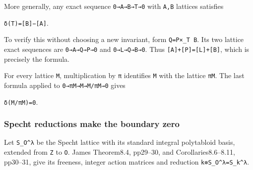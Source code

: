 \documentclass[
  10pt,
]{article}
\begin{document}
More generally, any exact sequence
\texttt{\small 0→\allowbreak{}A→\allowbreak{}B→\allowbreak{}T→\allowbreak{}0}
with \texttt{\small A,\allowbreak{}B} lattices satisfies

\texttt{\small δ(\allowbreak{}T)\allowbreak{}=\allowbreak{}[\allowbreak{}B]\allowbreak{}−[\allowbreak{}A]\allowbreak{}}.

To verify this without choosing a new invariant, form
\texttt{\small Q=\allowbreak{}P×\_\allowbreak{}T B}. Its two lattice
exact sequences are
\texttt{\small 0→\allowbreak{}A→\allowbreak{}Q→\allowbreak{}P→\allowbreak{}0}
and
\texttt{\small 0→\allowbreak{}L→\allowbreak{}Q→\allowbreak{}B→\allowbreak{}0}.
Thus
\texttt{\small [\allowbreak{}A]\allowbreak{}+\allowbreak{}[\allowbreak{}P]\allowbreak{}=\allowbreak{}[\allowbreak{}L]\allowbreak{}+\allowbreak{}[\allowbreak{}B]\allowbreak{}},
which is precisely the formula.

For every lattice \texttt{\small M}, multiplication by \texttt{\small π}
identifies \texttt{\small M} with the lattice \texttt{\small πM}. The
last formula applied to
\texttt{\small 0→\allowbreak{}πM→\allowbreak{}M→\allowbreak{}M/\allowbreak{}πM→\allowbreak{}0}
gives

\texttt{\small δ(\allowbreak{}M/\allowbreak{}πM)\allowbreak{}=\allowbreak{}0}.

\subsubsection{Specht reductions make the boundary
zero}\label{specht-reductions-make-the-boundary-zero}

Let \texttt{\small S\_\allowbreak{}O\textasciicircum{}λ} be the Specht
lattice with its standard integral polytabloid basis, extended from
\texttt{\small Z} to \texttt{\small O}. James Theorem8.4, pp29--30, and
Corollaries8.6--8.11, pp30--31, give its freeness, integer action
matrices and reduction
\texttt{\small k⊗\allowbreak{}S\_\allowbreak{}O\textasciicircum{}λ=\allowbreak{}S\_\allowbreak{}k\textasciicircum{}λ}.
\end{document}
